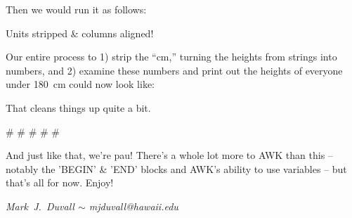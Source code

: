 \documentclass[10pt,a4]{article}
\begin{document}
Then we would run it as follows:

\ttfamily
\colorbox{black}{}

\colorbox{black}{}
\normalfont

Units stripped \& columns aligned!

Our entire process to 1) strip the ``cm,'' turning the heights from strings into numbers, and 2) examine these numbers and print out the heights of everyone under 180~cm could now look like:

\ttfamily
\colorbox{black}{}
\normalfont

That cleans things up quite a bit.


\# \# \# \# \#



And just like that, we're pau! There's a whole lot more to AWK than this -- notably the 'BEGIN' \& 'END' blocks and AWK's ability to use variables -- but that's all for now. Enjoy!


\emph{Mark~J.~Duvall $\sim$ mjduvall@hawaii.edu}



\end{document}
